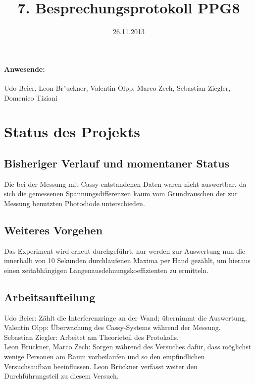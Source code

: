 \documentclass[
]{scrartcl}
\begin{document}
\title{7. Besprechungsprotokoll PPG8}
\date{26.11.2013}
\maketitle

\paragraph{Anwesende:}
Udo Beier, Leon Br"uckner, Valentin Olpp, Marco Zech, Sebastian Ziegler, Domenico Tiziani


\section{Status des Projekts}

\subsection{Bisheriger Verlauf und momentaner Status}
Die bei der Messung mit Cassy entstandenen Daten waren nicht auswertbar, da sich die gemessenen Spannungsdifferenzen kaum vom Grundrauschen der zur Messung benutzten Photodiode unterschieden.

\subsection{Weiteres Vorgehen}
Das Experiment wird erneut durchgeführt, nur werden zur Auswertung nun die innerhalb von 10 Sekunden durchlaufenen Maxima per Hand gezählt, um hieraus einen zeitabhängigen Längenausdehnungskoeffizienten zu ermitteln.

\subsection{Arbeitsaufteilung}
Udo Beier: Zählt die Interferenzringe an der Wand; übernimmt die Auswertung. \\
Valentin Olpp: Überwachung des Cassy-Systems während der Messung. \\
Sebastian Ziegler: Arbeitet am Theorieteil des Protokolls. \\
Leon Brückner, Marco Zech: Sorgen während des Versuches dafür, dass möglichst wenige Personen am Raum vorbeilaufen und so den empfindlichen Versuchsaufbau beeinflussen. Leon Brückner verfasst weiter den Durchführungsteil zu diesem Versuch. 
\end{document}
